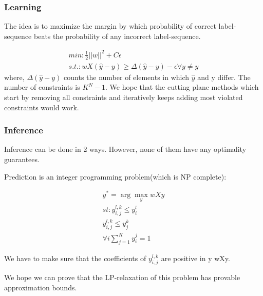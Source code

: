 \documentclass[11pt]{article} %
\begin{document}
\subsubsection{Learning}
The idea is to maximize the margin by which probability of correct label-sequence beats the probability of any incorrect label-sequence.

\begin{eqnarray*}
min: \frac{1}{2} ||w||^2 + C\epsilon\\
s.t.: wX(\hat{y}-y)\ge \Delta(\hat{y}-y) -\epsilon \forall y\neq \hat{y}
\end{eqnarray*}
where, $\Delta(\hat{y}-y)$ counts the number of elements in which $\hat{y}$ and y differ.
The number of constraints is $K^N-1$. We hope that the cutting plane methods\cite{joachims2009cutting} 
which start by removing all constraints and  iteratively keeps adding most violated constraints would work.
\subsubsection{Inference}
Inference can be done in 2 ways. However, none of them have any optimality guarantees.

Prediction is an integer programming problem(which is NP complete):


\begin{eqnarray*}
y^*=\arg \max _y wXy\\
st: y_{i,j}^{l,k}\le y_i^l\\
y_{i,j}^{l,k}\le y_j^k\\
\forall i \sum_{j=1}^{K} y_i^j = 1
\end{eqnarray*}
 
We have to make sure that the coefficients of $y_{i,j}^{l,k}$ are positive in  y wXy.

We hope we can prove that the LP-relaxation of this problem has provable approximation bounds.
\end{document}
